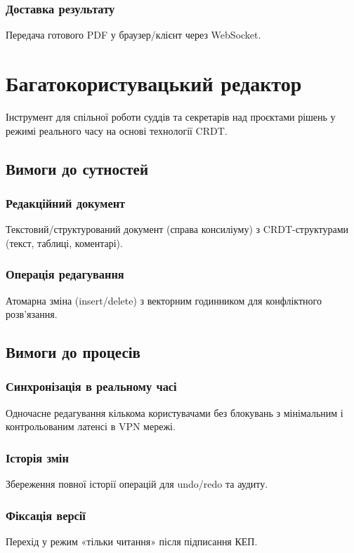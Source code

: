\documentclass{article}
\begin{document}
\subsubsection{Доставка результату}
Передача готового PDF у браузер/клієнт через WebSocket.

\newpage
\section{Багатокористувацький редактор}
Інструмент для спільної роботи суддів та секретарів над проєктами рішень у режимі реального часу на основі технології CRDT.

\subsection{Вимоги до сутностей}
\subsubsection{Редакційний документ}
Текстовий/структурований документ (справа консиліуму) з CRDT-структурами (текст, таблиці, коментарі).

\subsubsection{Операція редагування}
Атомарна зміна (insert/delete) з векторним годинником для конфліктного розв’язання.

\subsection{Вимоги до процесів}
\subsubsection{Синхронізація в реальному часі}
Одночасне редагування кількома користувачами без блокувань з мінімальним і контрольованим латенсі в VPN мережі.

\subsubsection{Історія змін}
Збереження повної історії операцій для undo/redo та аудиту.

\subsubsection{Фіксація версії}
Перехід у режим «тільки читання» після підписання КЕП.
\end{document}

